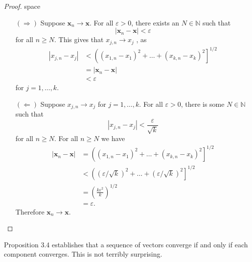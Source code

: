 \documentclass{article}
\newcommand{\N}{\mathbb{N}}
\newcommand{\x}{\mathbf{x}}
\theoremstyle{definition}
\begin{document}
	\begin{proof}{\color{white}space}
		\begin{enumerate}
			\item [$ (\Longrightarrow) $] Suppose $ \x_n\to \x $. For all $ \varepsilon>0 $, there exists an $ N\in\N $ such that $$|\x_n-\x|<\varepsilon $$ for all $ n\ge N $. This gives that  $ x_{j,n}\to x_j $ , as
			\begin{align*}
				|x_{j,n}- x_j|&<\left((x_{1,n}- x_1)^2+\ldots+(x_{k,n}- x_k)^2\right]^{1/2}\\&=|\x_n-\x|\\&<\varepsilon
			\end{align*}  for $ j=1,\ldots,k $. 
			\item [$ (\Longleftarrow) $]  Suppose $ x_{j,n}\to x_j  $ for $ j=1,\ldots,k $. For all $ \varepsilon>0 $, there is some $ N\in\N $ such that $$ |x_{j,n}-x_j|<\frac{\varepsilon}{\sqrt{k}}$$ for all $ n\ge N $. For all $ n\ge N $ we have 
			\begin{align*}
				|\x_n-\x|&=\left((x_{1,n}- x_1)^2+\ldots+(x_{k,n}- x_k)^2\right]^{1/2}\\&<\left((\varepsilon/\sqrt{k})^2+\ldots+(\varepsilon/\sqrt{k})^2\right]^{1/2}\\&=\left(\frac{k\varepsilon^2}{k}\right)^{1/2}\\&=\varepsilon.
			\end{align*}
			Therefore $ \x_n\to \x $.
		\end{enumerate}
	\end{proof}
	Proposition 3.4 establishes that a sequence of vectors converge if and only if each component converges. This is not terribly surprising. 
\end{document}
